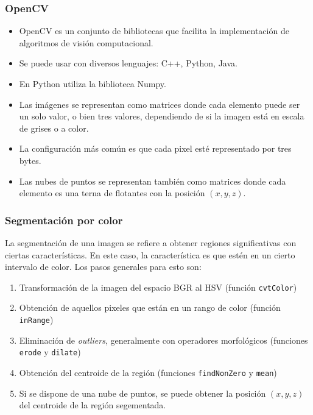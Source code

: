 \begin{frame}\frametitle{OpenCV}
  \begin{itemize}
  \item OpenCV es un conjunto de bibliotecas que facilita la implementación de algoritmos de visión computacional.
  \item Se puede usar con diversos lenguajes: C++, Python, Java.
  \item En Python utiliza la biblioteca Numpy.
  \item Las imágenes se representan como matrices donde cada elemento puede ser un solo valor, o bien tres valores, dependiendo de si la imagen está en escala de grises o a color.
  \item La configuración más común es que cada pixel esté representado por tres bytes.
  \item Las nubes de puntos se representan también como matrices donde cada elemento es una terna de flotantes con la posición $(x,y,z)$.
  \end{itemize}
\end{frame}

\begin{frame}\frametitle{Segmentación por color}
  La segmentación de una imagen se refiere a obtener regiones significativas con ciertas características. En este caso, la característica es que estén en un cierto intervalo de color. Los pasos generales para esto son:
  \begin{enumerate}
  \item Transformación de la imagen del espacio BGR al HSV (función \texttt{cvtColor})
  \item Obtención de aquellos pixeles que están en un rango de color (función \texttt{inRange})
  \item Eliminación de \textit{outliers}, generalmente con operadores morfológicos (funciones \texttt{erode} y \texttt{dilate})
  \item Obtención del centroide de la región (funciones \texttt{findNonZero} y \texttt{mean})
  \item Si se dispone de una nube de puntos, se puede obtener la posición $(x,y,z)$ del centroide de la región segementada. 
  \end{enumerate}
\end{frame}

